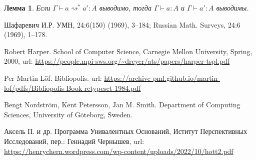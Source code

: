 \documentclass[openany]{book}
\theoremstyle{plain}
\newtheorem{lem}[thm]{Лемма}
\theoremstyle{definition}
\begin{document}
\begin{lem}
Если \(\Gamma \vdash a \rightsquigarrow^* a' : A\) выводимо, тогда \(\Gamma \vdash a : A\) и \(\Gamma \vdash a' : A\) выводимы.
\end{lem}

\begin{thebibliography}{2}

    Шафаревич И.Р.
    \newblock УМН, 24:6(150) (1969), 3–184; Russian Math. Surveys, 24:6 (1969), 1–178.

    Robert Harper.
    \newblock School of Computer Science, Carnegie Mellon University, Spring, 2000,
    \newblock url: \url{https://people.mpi-sws.org/~dreyer/ats/papers/harper-tspl.pdf}

    Per Martin-L\"{o}f.
    \newblock Bibliopolis.
    \newblock url: \url{https://archive-pml.github.io/martin-lof/pdfs/Bibliopolis-Book-retypeset-1984.pdf}

    Bengt Nordstr\"{o}m, Kent Petersson, Jan M. Smith.
    \newblock Department of Computing Sciences, University of G\"{o}teborg, Sweden.

    \bibitem{}
    Аксель П. и др.
    \newblock Программа Унивалентных Оснований, Иститут Перспективных Исследований, пер.: Геннадий Чернышев,
    \newblock url: \url{https://henrychern.wordpress.com/wp-content/uploads/2022/10/hott2.pdf}

\end{thebibliography}
\end{document}

